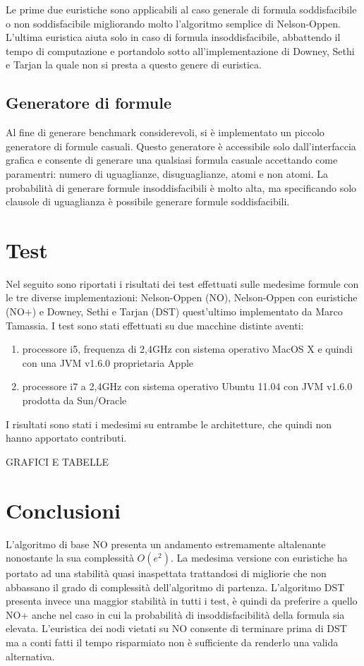 \documentclass[a4paper,11pt]{article}
\begin{document}
Le prime due euristiche sono applicabili al caso generale di formula soddisfacibile o non soddisfacibile migliorando molto l'algoritmo semplice di Nelson-Oppen.
L'ultima euristica aiuta solo in caso di formula insoddisfacibile, abbattendo il tempo di computazione e portandolo sotto all'implementazione di Downey, Sethi e Tarjan la quale non si presta a questo genere di euristica.
\subsection{Generatore di formule}
Al fine di generare benchmark considerevoli, si è implementato un piccolo generatore di formule casuali.
Questo generatore è accessibile solo dall'interfaccia grafica e consente di generare una qualsiasi formula casuale accettando come paramentri: numero di uguaglianze, disuguaglianze, atomi e non atomi.
La probabilità di generare formule insoddisfacibili è molto alta, ma specificando solo clausole di uguaglianza è possibile generare formule soddisfacibili.
\section{Test}
Nel seguito sono riportati i risultati dei test effettuati sulle medesime formule con le tre diverse implementazioni: Nelson-Oppen (NO), Nelson-Oppen con euristiche (NO+) e Downey, Sethi e Tarjan (DST) quest'ultimo implementato da Marco Tamassia.
I test sono stati effettuati su due macchine distinte aventi:
\begin{enumerate}
	\item processore i5, frequenza di 2,4GHz con sistema operativo MacOS X e quindi con una JVM v1.6.0 proprietaria Apple
	\item processore i7 a 2,4GHz con sistema operativo Ubuntu 11.04 con JVM v1.6.0 prodotta da Sun/Oracle
\end{enumerate}
I risultati sono stati i medesimi su entrambe le architetture, che quindi non hanno apportato contributi.

GRAFICI E TABELLE

\section{Conclusioni}
L'algoritmo di base NO presenta un andamento estremamente altalenante nonostante la sua complessità $O(e^2)$.
La medesima versione con euristiche ha portato ad una stabilità quasi inaspettata trattandosi di migliorie che non abbassano il grado di complessità dell'algoritmo di partenza.
L'algoritmo DST presenta invece una maggior stabilità in tutti i test, è quindi da preferire a quello NO+ anche nel caso in cui la probabilità di insoddisfacibilità della formula sia elevata.
L'euristica dei nodi vietati su NO consente di terminare prima di DST ma a conti fatti il tempo risparmiato non è sufficiente da renderlo una valida alternativa.
\end{document}
